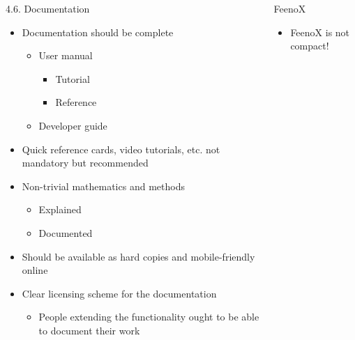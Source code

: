 \documentclass[
  ignorenonframetext,
  aspectratio=169,
]{beamer}
\providecommand{\tightlist}{%
  \setlength{\itemsep}{0pt}\setlength{\parskip}{0pt}}
\begin{document}
\begin{frame}{}
\protect\hypertarget{section-14}{}
\begin{columns}[T]
\begin{column}{0.5\textwidth}
\begin{block}{4.6. Documentation}
\protect\hypertarget{documentation}{}
\begin{itemize}
\tightlist
\item
  Documentation should be complete

  \begin{itemize}
  \tightlist
  \item
    User manual

    \begin{itemize}
    \tightlist
    \item
      Tutorial
    \item
      Reference
    \end{itemize}
  \item
    Developer guide
  \end{itemize}
\item
  Quick reference cards, video tutorials, etc. not mandatory but
  recommended
\item
  Non-trivial mathematics and methods

  \begin{itemize}
  \tightlist
  \item
    Explained
  \item
    Documented
  \end{itemize}
\item
  Should be available as hard copies and mobile-friendly online
\item
  Clear licensing scheme for the documentation

  \begin{itemize}
  \tightlist
  \item
    People extending the functionality ought to be able to document
    their work
  \end{itemize}
\end{itemize}
\end{block}
\end{column}

\begin{column}{0.5\textwidth}
\begin{exampleblock}{FeenoX}
\protect\hypertarget{feenox-12}{}
\begin{itemize}
\tightlist
\item
  FeenoX is not compact!


\end{itemize}
\end{exampleblock}
\end{column}
\end{columns}
\end{frame}
\end{document}

